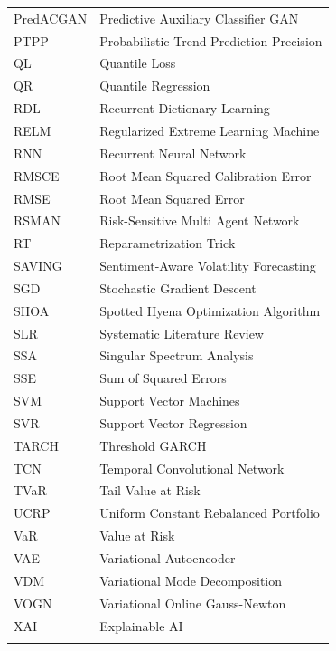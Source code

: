 \begin{table}[H]
\begin{subtable}[t]{0.49\textwidth}
\begin{tabular}{lp{}}
        PredACGAN & Predictive Auxiliary Classifier GAN \\
        PTPP & Probabilistic Trend Prediction Precision \\
        QL & Quantile Loss \\
        QR & Quantile Regression \\
        RDL & Recurrent Dictionary Learning \\
        RELM & Regularized Extreme Learning Machine \\
        RNN & Recurrent Neural Network \\
        RMSCE & Root Mean Squared Calibration Error \\
        RMSE & Root Mean Squared Error \\
        RSMAN & Risk-Sensitive Multi Agent Network \\
        RT & Reparametrization Trick \\
        SAVING & Sentiment-Aware Volatility Forecasting \\
        SGD & Stochastic Gradient Descent \\ 
        SHOA & Spotted Hyena Optimization Algorithm \\
        SLR & Systematic Literature Review \\
        SSA & Singular Spectrum Analysis \\
        SSE & Sum of Squared Errors \\
        SVM & Support Vector Machines \\
        SVR & Support Vector Regression \\
        TARCH & Threshold GARCH \\
        TCN & Temporal Convolutional Network \\
        TVaR & Tail Value at Risk \\
        UCRP & Uniform Constant Rebalanced Portfolio \\
        VaR & Value at Risk \\
        VAE & Variational Autoencoder \\
        VDM & Variational Mode Decomposition \\
        VOGN & Variational Online Gauss-Newton \\
        XAI & Explainable AI \\
        &\\
        \bottomrule
        \end{tabular}
    \end{subtable}
\end{table}

